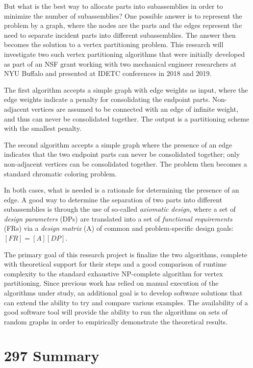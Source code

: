 \documentclass[letterpaper,12pt]{article}
\begin{document}
But what is the best way to allocate parts into subassemblies in order to minimize the number of subassemblies?
One possible answer is to represent the problem by a graph, where the nodes are the parts and the edges represent
the need to separate incident parts into different subassemblies.  The answer then becomes the solution to a
vertex partitioning problem.  This research will investigate two such vertex partitioning algorithms that were
initially developed as part of an NSF grant working with two mechanical engineer researchers at NYU Buffalo and
presented at IDETC conferences in 2018 and 2019.

The first algorithm accepts a simple graph with edge weights as input, where the edge weights indicate a penalty for
consolidating the endpoint parts.  Non-adjacent vertices are assumed to be connected with an edge of infinite
weight, and thus can never be consolidated together.  The output is a partitioning scheme with the smallest
penalty.

The second algorithm accepts a simple graph where the presence of an edge indicates that the two endpoint parts can
never be consolidated together; only non-adjacent vertices can be consolidated together.  The problem then becomes
a standard chromatic coloring problem.

In both cases, what is needed is a rationale for determining the presence of an edge.  A good way to determine the
separation of two parts into different subassemblies is through the use of so-called \emph{axiomatic design}, where
a set of \emph{design parameters} (DPs) are translated into a set of \emph{functional requirements} (FRs) via a
\emph{design matrix} (A) of common and problem-specific design goals: \([FR]=[A][DP]\).

The primary goal of this research project is finalize the two algorithms, complete with theoretical support for
their steps and a good comparison of runtime complexity to the standard exhaustive NP-complete algorithm for vertex
partitioning.  Since previous work has relied on manual execution of the algorithms under study, an additional goal
is to develop software solutions that can extend the ability to try and compare various examples.  The availability
of a good software tool will provide the ability to run the algorithms on sets of random graphs in order to
empirically demonstrate the theoretical results.

\section*{297 Summary}
\end{document}
